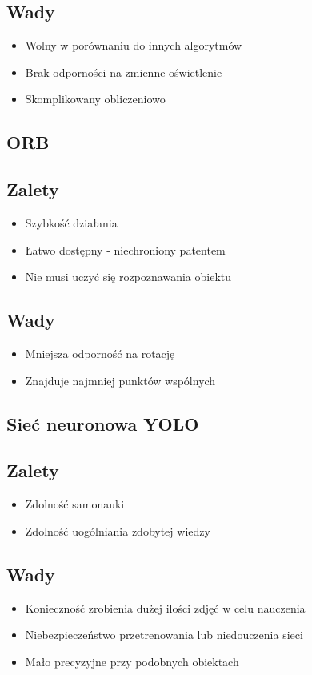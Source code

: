 \documentclass[polish,a4paper]{article}
\begin{document}
\subsection{Wady}
\begin{itemize}
  \item Wolny w porównaniu do innych algorytmów
  \item Brak odporności na zmienne oświetlenie
  \item Skomplikowany obliczeniowo
\end{itemize}

\subsection{ORB}
\subsection{Zalety}
\begin{itemize}
  \item Szybkość działania
  \item Łatwo dostępny - niechroniony patentem
  \item Nie musi uczyć się rozpoznawania obiektu
\end{itemize}

\subsection{Wady}
\begin{itemize}
  \item Mniejsza odporność na rotację
  \item Znajduje najmniej punktów wspólnych
\end{itemize}


\subsection{Sieć neuronowa YOLO}
\subsection{Zalety}
\begin{itemize}
  \item Zdolność samonauki
  \item Zdolność uogólniania zdobytej wiedzy
\end{itemize}

\subsection{Wady}
\begin{itemize}
  \item Konieczność zrobienia dużej ilości zdjęć w celu nauczenia
  \item Niebezpieczeństwo przetrenowania lub niedouczenia sieci
  \item Mało precyzyjne przy podobnych obiektach
\end{itemize}
\end{document}
